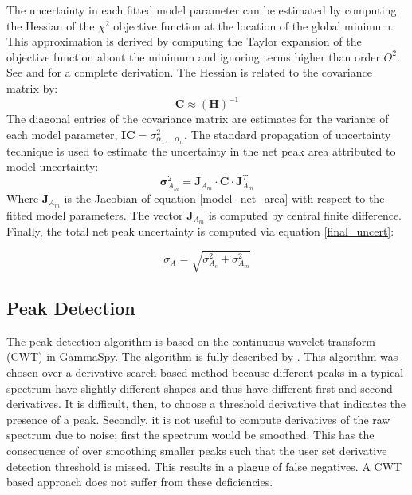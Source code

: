 \documentclass[10pt]{article}
\begin{document}
The uncertainty in each fitted model parameter can be estimated by computing the Hessian of the $\chi^2$ objective
 function at the location of the global minimum.  This approximation is derived by computing the Taylor expansion of the objective function about
 the minimum and ignoring terms higher than order $O^2$.  See \cite{cvonline:2017} and \cite{gavin:2017} for a complete derivation.
The Hessian is related to the covariance matrix by:
\begin{equation}
   \bm C \approx (\bm H)^{-1}
\end{equation}
The diagonal entries of the covariance matrix are estimates for the variance of each model parameter,
$\bm I \bm C = \sigma_{\alpha_1, ... \alpha_n}^2$.
The standard propagation of uncertainty technique is used to estimate the uncertainty in the net
peak area attributed to model uncertainty:
\begin{equation}
    \bm \sigma^2_{A_m} = \bm J_{A_m} \cdot \bm C  \cdot \bm J_{A_m}^T
\end{equation}
Where $\bm J_{A_m}$ is the Jacobian of equation \ref{model_net_area} with respect to the fitted model parameters.  The
vector $\bm J_{A_m}$ is computed by central finite difference. \\

Finally, the total net peak uncertainty is computed via equation \ref{final_uncert}:

\begin{equation}
    \sigma_A = \sqrt{\sigma_{A_c}^2 + \sigma_{A_m}^2}
    \label{final_uncert}
\end{equation}

\subsection{Peak Detection}

The peak detection algorithm is based on the continuous wavelet transform (CWT) in GammaSpy.
The algorithm is fully described by \cite{Du:2006}.
This algorithm was chosen over a derivative search based method because different peaks
in a typical spectrum have slightly different shapes and thus have different first and
second derivatives.  It is difficult, then, to choose a threshold derivative that indicates
the presence of a peak.  Secondly, it is not useful to compute derivatives of the raw
spectrum due to noise; first the spectrum would be smoothed.  This has the consequence of
over smoothing smaller peaks such that the user set derivative detection threshold
is missed.  This results in a plague of false negatives. 
A CWT based approach does not suffer from these deficiencies. \\
\end{document}
